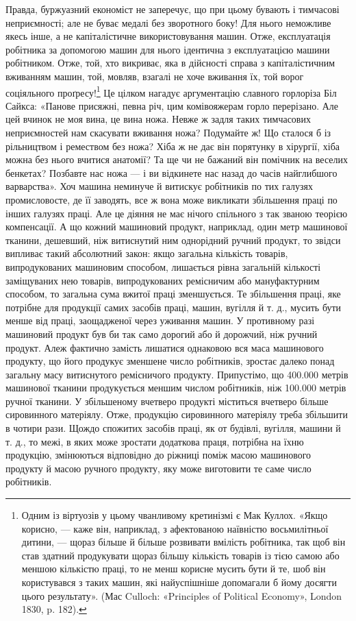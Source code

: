 Правда, буржуазний економіст не заперечує, що при цьому
бувають і тимчасові неприємності; але не буває медалі без зворотного
боку! Для нього неможливе якесь інше, а не капіталістичне
використовування машин. Отже, експлуатація робітника за допомогою
машин для нього ідентична з експлуатацією машини робітником.
Отже, той, хто викриває, яка в дійсності справа з капіталістичним
вживанням машин, той, мовляв, взагалі не хоче вживання
їх, той ворог соціяльного проґресу!\footnote{
Одним із віртуозів у цьому чванливому кретинізмі є Мак Куллох.
«Якщо корисно, — каже він, наприклад, з афектованою наївністю
восьмилітньої дитини, — щораз більше й більше розвивати вмілість робітника,
так щоб він став здатний продукувати щораз більшу кількість товарів
із тією самою або меншою кількістю праці, то не менш корисне мусить
бути й те, шоб він користувався з таких машин, які найуспішніше допомагали
б йому досягти цього результату». (Мас Culloch: «Principles
of Political Economy», London 1830, p. 182).
} Це цілком нагадує
аргументацію славного горлоріза Біл Сайкса: «Панове присяжні,
певна річ, цим комівояжерам горло перерізано. Але цей вчинок
не моя вина, це вина ножа. Невже ж задля таких тимчасових
неприємностей нам скасувати вживання ножа? Подумайте ж!
Що сталося б із рільництвом і ремеством без ножа? Хіба ж не
дає він порятунку в хірургії, хіба можна без нього вчитися анатомії?
Та ще чи не бажаний він помічник на веселих бенкетах?
Позбавте нас ножа — і ви відкинете нас назад до часів найглибшого
варварства».
Хоч машина неминуче й витискує робітників по тих галузях
промисловосте, де її заводять, все ж вона може викликати збільшення
праці по інших галузях праці. Але це діяння не має нічого
спільного з так званою теорією компенсації. А що кожний машиновий
продукт, наприклад, один метр машинової тканини, дешевший,
ніж витиснутий ним однорідний ручний продукт, то звідси випливає
такий абсолютний закон: якщо загальна кількість товарів,
випродукованих машиновим способом, лишається рівна загальній
кількості заміщуваних нею товарів, випродукованих ремісничим
або мануфактурним способом, то загальна сума вжитої праці
зменшується. Те збільшення праці, яке потрібне для продукції
самих засобів праці, машин, вугілля й т. д., мусить бути менше
від праці, заощадженої через уживання машин. У противному
разі машиновий продукт був би так само дорогий або й дорожчий,
ніж ручний продукт. Алеж фактично замість лишатися однаковою
вся маса машинового продукту, що його продукує зменшене
число робітників, зростає далеко понад загальну масу витиснутого
ремісничого продукту. Припустімо, що 400.000 метрів машинової
тканини продукується меншим числом робітників, ніж 100.000
метрів ручної тканини. У збільшеному вчетверо продукті міститься
вчетверо більше сировинного матеріялу. Отже, продукцію
сировинного матеріялу треба збільшити в чотири рази. Щождо
спожитих засобів праці, як от будівлі, вугілля, машини й т. д.,
то межі, в яких може зростати додаткова праця, потрібна на їхню
продукцію, змінюються відповідно до ріжниці поміж масою машинового
продукту й масою ручного продукту, яку може виготовити
те саме число робітників.

